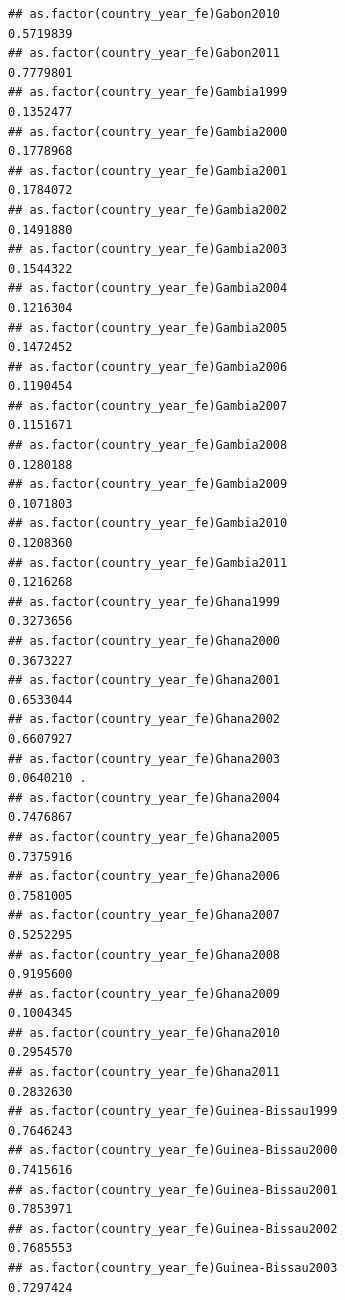 \documentclass[
  a4paper,
]{article}
\begin{document}
\begin{verbatim}
## as.factor(country_year_fe)Gabon2010                            0.5719839    
## as.factor(country_year_fe)Gabon2011                            0.7779801    
## as.factor(country_year_fe)Gambia1999                           0.1352477    
## as.factor(country_year_fe)Gambia2000                           0.1778968    
## as.factor(country_year_fe)Gambia2001                           0.1784072    
## as.factor(country_year_fe)Gambia2002                           0.1491880    
## as.factor(country_year_fe)Gambia2003                           0.1544322    
## as.factor(country_year_fe)Gambia2004                           0.1216304    
## as.factor(country_year_fe)Gambia2005                           0.1472452    
## as.factor(country_year_fe)Gambia2006                           0.1190454    
## as.factor(country_year_fe)Gambia2007                           0.1151671    
## as.factor(country_year_fe)Gambia2008                           0.1280188    
## as.factor(country_year_fe)Gambia2009                           0.1071803    
## as.factor(country_year_fe)Gambia2010                           0.1208360    
## as.factor(country_year_fe)Gambia2011                           0.1216268    
## as.factor(country_year_fe)Ghana1999                            0.3273656    
## as.factor(country_year_fe)Ghana2000                            0.3673227    
## as.factor(country_year_fe)Ghana2001                            0.6533044    
## as.factor(country_year_fe)Ghana2002                            0.6607927    
## as.factor(country_year_fe)Ghana2003                            0.0640210 .  
## as.factor(country_year_fe)Ghana2004                            0.7476867    
## as.factor(country_year_fe)Ghana2005                            0.7375916    
## as.factor(country_year_fe)Ghana2006                            0.7581005    
## as.factor(country_year_fe)Ghana2007                            0.5252295    
## as.factor(country_year_fe)Ghana2008                            0.9195600    
## as.factor(country_year_fe)Ghana2009                            0.1004345    
## as.factor(country_year_fe)Ghana2010                            0.2954570    
## as.factor(country_year_fe)Ghana2011                            0.2832630    
## as.factor(country_year_fe)Guinea-Bissau1999                    0.7646243    
## as.factor(country_year_fe)Guinea-Bissau2000                    0.7415616    
## as.factor(country_year_fe)Guinea-Bissau2001                    0.7853971    
## as.factor(country_year_fe)Guinea-Bissau2002                    0.7685553    
## as.factor(country_year_fe)Guinea-Bissau2003                    0.7297424    

\end{verbatim}
\end{document}
